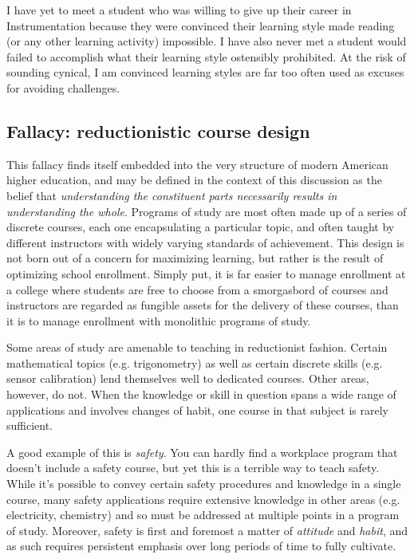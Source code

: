 \vskip 10pt

I have yet to meet a student who was willing to give up their career in Instrumentation because they were convinced their learning style made reading (or any other learning activity) impossible.  I have also never met a student would failed to accomplish what their learning style ostensibly prohibited.  At the risk of sounding cynical, I am convinced learning styles are far too often used as excuses for avoiding challenges.








\subsection{Fallacy: reductionistic course design}

This fallacy finds itself embedded into the very structure of modern American higher education, and may be defined in the context of this discussion as the belief that \textit{understanding the constituent parts necessarily results in understanding the whole}.  Programs of study are most often made up of a series of discrete courses, each one encapsulating a particular topic, and often taught by different instructors with widely varying standards of achievement.  This design is not born out of a concern for maximizing learning, but rather is the result of optimizing school enrollment.  Simply put, it is far easier to manage enrollment at a college where students are free to choose from a smorgasbord of courses and instructors are regarded as fungible assets for the delivery of these courses, than it is to manage enrollment with monolithic programs of study.

Some areas of study are amenable to teaching in reductionist fashion.  Certain mathematical topics (e.g. trigonometry) as well as certain discrete skills (e.g. sensor calibration) lend themselves well to dedicated courses.  Other areas, however, do not.  When the knowledge or skill in question spans a wide range of applications and involves changes of habit, one course in that subject is rarely sufficient.

\vskip 10pt

A good example of this is \textit{safety}.  You can hardly find a workplace program that doesn't include a safety course, but yet this is a terrible way to teach safety.  While it's possible to convey certain safety procedures and knowledge in a single course, many safety applications require extensive knowledge in other areas (e.g. electricity, chemistry) and so must be addressed at multiple points in a program of study.  Moreover, safety is first and foremost a matter of \textit{attitude} and \textit{habit}, and as such requires persistent emphasis over long periods of time to fully cultivate.

